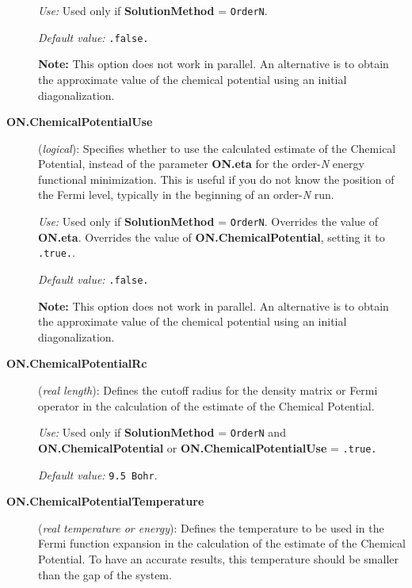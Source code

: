 \begin{description}
\textit{Use:} Used only if \textbf{SolutionMethod} = \texttt{OrderN}.

\textit{Default value:} \texttt{.false.}

\textbf{Note:} This option does not work in parallel. An alternative
is to obtain the approximate value of the chemical potential using
an initial diagonalization.


\item[\textbf{ON.ChemicalPotentialUse}] (\textit{logical}):
Specifies whether to use the calculated estimate of the
Chemical Potential, instead of the parameter
\textbf{ON.eta}
for the order-\textit{N} energy functional minimization.
This is useful if you do not know the position
of the Fermi level, typically in the beginning
of an order-\emph{N} run.

\textit{Use:} Used only if \textbf{SolutionMethod} = \texttt{OrderN}.
Overrides the value of \textbf{ON.eta}.
Overrides the value of \textbf{ON.ChemicalPotential}, setting
it to \texttt{.true.}.

\textit{Default value:} \texttt{.false.}

\textbf{Note:} This option does not work in parallel. An alternative
is to obtain the approximate value of the chemical potential using
an initial diagonalization.

\item[\textbf{ON.ChemicalPotentialRc}]  (\textit{real length}):
Defines the cutoff radius for the density matrix or Fermi
operator in the calculation of the estimate of the
Chemical Potential.

\textit{Use:} Used only if \textbf{SolutionMethod} = \texttt{OrderN}
and \textbf{ON.ChemicalPotential} or  \textbf{ON.ChemicalPotentialUse}
= \texttt{.true.}

\textit{Default value:} \texttt{9.5 Bohr}.

\item[\textbf{ON.ChemicalPotentialTemperature}]  (\textit{real temperature
or energy}):
Defines the temperature to be used in the Fermi function expansion
in the calculation of the estimate of the Chemical Potential.
To have an accurate results, this temperature should be smaller
than the gap of the system.


\end{description}
